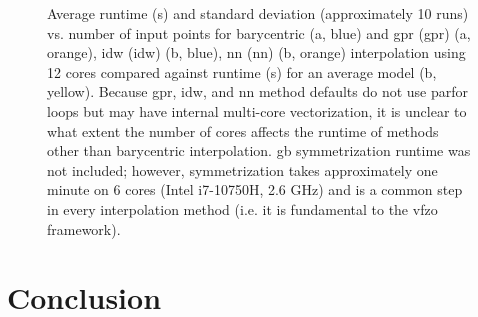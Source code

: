 \documentclass[preprint,12pt]{elsarticle}
\begin{document}
\begin{figure}
    \caption{
    Average runtime (s) and standard deviation (approximately 10 runs) vs. number of input points for barycentric (a, blue) and \acrlong{gpr} (\acrshort{gpr}) (a, orange), \acrlong{idw} (\acrshort{idw}) (b, blue), \acrlong{nn} (\acrshort{nn}) (b, orange) interpolation using 12 cores compared against runtime (s) for an average model (b, yellow). Because \acrshort{gpr}, \acrshort{idw}, and \acrshort{nn} method defaults do not use parfor loops but may have internal multi-core vectorization, it is unclear to what extent the number of cores affects the runtime of methods other than barycentric interpolation. \Acrlong{gb} symmetrization runtime was not included; however, symmetrization takes approximately one minute on 6 cores (Intel i7-10750H, 2.6 GHz) and is a common step in every interpolation method (i.e. it is fundamental to the \acrlong{vfzo} framework).
    }
    \label{fig:runtime}
\end{figure}

\section{Conclusion} \label{sec:conclusion}
\end{document}
